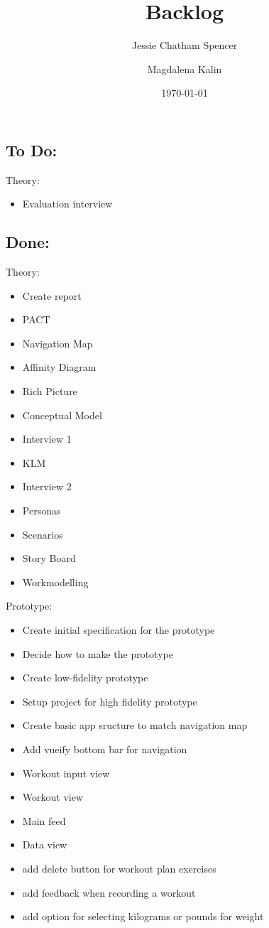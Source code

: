 \documentclass{article}
\title{Backlog}
\author{Jessie Chatham Spencer \and Magdalena Kalin}
\date{\today}
\begin{document}
\maketitle
\subsection*{To Do:}
Theory:
\begin{itemize}
\item Evaluation interview
\end{itemize}


\subsection*{Done:}
Theory:
\begin{itemize}
\item Create report
\item PACT 
\item Navigation Map
\item Affinity Diagram
\item Rich Picture
\item Conceptual Model
\item Interview 1
\item KLM
\item Interview 2
\item Personas
\item Scenarios
\item Story Board
\item Workmodelling
\end{itemize}
Prototype:
\begin{itemize}
\item Create initial specification for the prototype
\item Decide how to make the prototype
\item Create low-fidelity prototype
\item Setup project for high fidelity prototype
\item Create basic app sructure to match navigation map
\item Add vueify bottom bar for navigation
\item Workout input view
\item Workout view
\item Main feed
\item Data view
\item add delete button for workout plan exercises
\item add feedback when recording a workout
\item add option for selecting kilograms or pounds for weight
\end{itemize}
\end{document}
